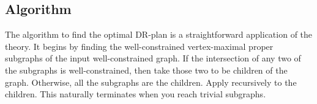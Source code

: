 


\subsection{Algorithm}
The algorithm to find the optimal DR-plan is a straightforward application of the theory. It begins by finding the well-constrained vertex-maximal proper subgraphs of the input well-constrained graph. If the intersection of any two of the subgraphs is well-constrained, then take those two to be children of the graph. Otherwise, all the subgraphs are the children. Apply recursively to the children. This naturally terminates when you reach trivial subgraphs.
